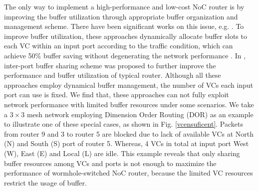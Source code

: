 \documentclass[10pt,conference]{IEEEtran}
\begin{document}
The only way to implement a high-performance and low-cost NoC router is by improving the buffer utilization through appropriate buffer organization and management scheme. There have been significant works on this issue, e.g. \cite{NPKV06,4555894,6310960}. To improve buffer utilization, these approaches dynamically allocate buffer slots to each VC within an input port according to the traffic condition, which can achieve 50\% buffer saving without degenerating the network performance \cite{NPKV06}. In \cite{Neishaburi:2009:RAN:1531542.1531658}\cite{5770788},
inter-port buffer sharing scheme was proposed to further improve the performance and buffer utilization of typical router. Although all these approaches employ dynamical buffer management, the number of VCs each input port can use is fixed. We find that, these approaches can not fully exploit network performance with limited buffer resources under some scenarios. We take a $3\times 3$ mesh network employing Dimension Order Routing (DOR) as an example to illustrate one of these special cases, as shown in Fig. \ref{vcensuficent}. Packets from router 9 and 3 to router 5 are blocked due to lack of available VCs at North (N) and South (S) port of router 5. Whereas, 4 VCs in total at input port West (W), East (E) and Local (L) are idle. This example reveals that only sharing buffer resources among VCs and ports is not enough to maximize the performance of wormhole-switched NoC router, because the limited VC resources restrict the usage of buffer.

\end{document}

